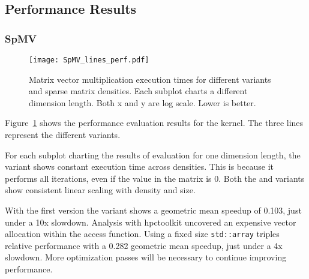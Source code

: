 \subsection{Performance Results}

\subsubsection{SpMV}
\begin{figure}
\texttt{[image: SpMV\_lines\_perf.pdf]}
\caption{Matrix vector multiplication execution times for different variants and sparse matrix densities. Each subplot charts a different dimension length. Both x and y are log scale. Lower is better.}
\label{SpMVPerformance}
\end{figure}
Figure~\ref{SpMVPerformance} shows the performance evaluation results for the \SpMV{} kernel. 
The three lines represent the different variants.

For each subplot charting the results of evaluation for one dimension length, the \dense{} variant shows constant execution time across densities.
This is because it performs all iterations, even if the value in the matrix is 0.
Both the \sparseraja{} and \specialized{} variants show consistent linear scaling with density and size. 


With the first version the \sparseraja{} variant shows a geometric mean speedup of 0.103, just under a 10x slowdown.
Analysis with hpctoolkit uncovered an expensive vector allocation within the access function.
Using a fixed size \verb.std::array. triples relative performance with a 0.282 geometric mean speedup, just under a 4x slowdown.
More optimization passes will be necessary to continue improving performance.

